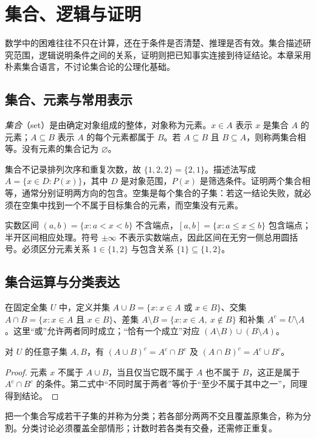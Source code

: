 \setcounter{chapter}{0} %
\chapter{集合、逻辑与证明}
\label{chap:em-language}
数学中的困难往往不只在计算，还在于条件是否清楚、推理是否有效。集合描述研究范围，逻辑说明条件之间的关系，证明则把已知事实连接到待证结论。本章采用朴素集合语言，不讨论集合论的公理化基础。

\section{集合、元素与常用表示}
\begin{definition}
\emph{集合}（set）是由确定对象组成的整体，对象称为元素。$x\in A$ 表示 $x$ 是集合 $A$ 的元素；$A\subseteq B$ 表示 $A$ 的每个元素都属于 $B$。若 $A\subseteq B$ 且 $B\subseteq A$，则称两集合相等。没有元素的集合记为 $\varnothing$。
\end{definition}
集合不记录排列次序和重复次数，故 $\{1,2,2\}=\{2,1\}$。描述法写成 $A=\{x\in D:P(x)\}$，其中 $D$ 是对象范围，$P(x)$ 是筛选条件。证明两个集合相等，通常分别证明两方向的包含。空集是每个集合的子集：若这一结论失败，就必须在空集中找到一个不属于目标集合的元素，而空集没有元素。

实数区间 $(a,b)=\{x:a<x<b\}$ 不含端点，$[a,b]=\{x:a\le x\le b\}$ 包含端点；半开区间相应处理。符号 $\pm\infty$ 不表示实数端点，因此区间在无穷一侧总用圆括号。必须区分元素关系 $1\in\{1,2\}$ 与包含关系 $\{1\}\subseteq\{1,2\}$。

\section{集合运算与分类表达}
在固定全集 $U$ 中，定义并集 $A\cup B=\{x:x\in A\text{ 或 }x\in B\}$、交集 $A\cap B=\{x:x\in A\text{ 且 }x\in B\}$、差集 $A\setminus B=\{x:x\in A,\ x\notin B\}$ 和补集 $A^c=U\setminus A$。这里“或”允许两者同时成立；“恰有一个成立”对应 $(A\setminus B)\cup(B\setminus A)$。

\begin{proposition}[德摩根律]
对 $U$ 的任意子集 $A,B$，有 $(A\cup B)^c=A^c\cap B^c$ 及 $(A\cap B)^c=A^c\cup B^c$。
\end{proposition}
\begin{proof}
元素 $x$ 不属于 $A\cup B$，当且仅当它既不属于 $A$ 也不属于 $B$，这正是属于 $A^c\cap B^c$ 的条件。第二式中“不同时属于两者”等价于“至少不属于其中之一”，同理得到结论。
\end{proof}
把一个集合写成若干子集的并称为分类；若各部分两两不交且覆盖原集合，称为分割。分类讨论必须覆盖全部情形；计数时若各类有交叠，还需修正重复。

